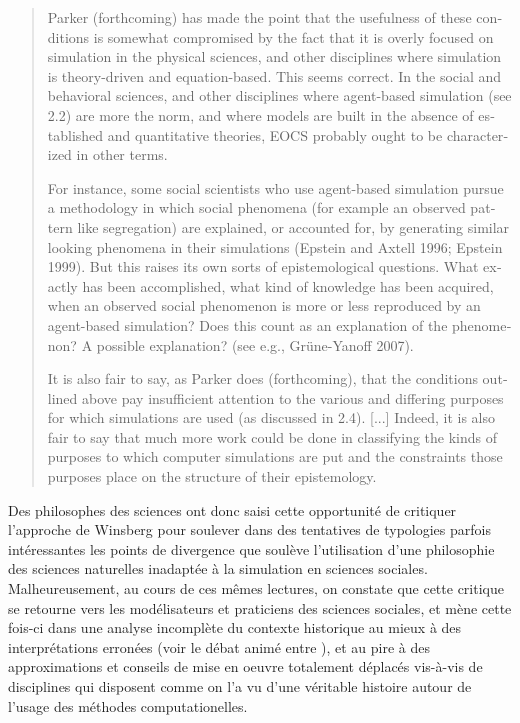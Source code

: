 \foreignblockquote{english}{Parker (forthcoming) has made the point that the usefulness of these conditions is somewhat compromised by the fact that it is overly focused on simulation in the physical sciences, and other disciplines where simulation is theory-driven and equation-based. This seems correct. In the social and behavioral sciences, and other disciplines where agent-based simulation (see 2.2) are more the norm, and where models are built in the absence of established and quantitative theories, EOCS probably ought to be characterized in other terms.

For instance, some social scientists who use agent-based simulation pursue a methodology in which social phenomena (for example an observed pattern like segregation) are explained, or accounted for, by generating similar looking phenomena in their simulations (Epstein and Axtell 1996; Epstein 1999). But this raises its own sorts of  epistemological questions. What exactly has been accomplished, what kind of knowledge has been acquired, when an observed social phenomenon is more or less reproduced by an agent-based simulation? Does this count as an explanation of the phenomenon? A possible explanation?
(see e.g., Grüne-Yanoff 2007).

It is also fair to say, as Parker does (forthcoming), that the conditions outlined above pay insufficient attention to the various and differing purposes for which simulations are used (as discussed in 2.4). [...] Indeed, it is also fair to say that much more work could be done in classifying the kinds of purposes to which computer simulations are put and the constraints those purposes place on the structure of their epistemology.}

Des philosophes des sciences ont donc saisi cette opportunité de critiquer l'approche de Winsberg pour soulever dans des tentatives de typologies parfois intéressantes \autocite{Eckhart2010} les points de divergence que soulève l'utilisation d'une philosophie des sciences naturelles inadaptée à la simulation en sciences sociales. Malheureusement, au cours de ces mêmes lectures, on constate que cette critique se retourne vers les modélisateurs et praticiens des sciences sociales, et mène cette fois-ci dans une analyse incomplète du contexte historique au mieux à des interprétations erronées (voir le débat animé entre \autocite{Yanoff2008}  \autocites{Elsenbroich2012, Chattoe2011}), et au pire à des approximations et conseils de mise en oeuvre totalement déplacés \autocite{Eckhart2010} vis-à-vis de disciplines qui disposent comme on l'a vu d'une véritable histoire autour de l'usage des méthodes computationelles.

